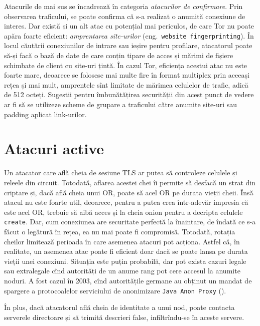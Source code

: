 Atacurile de mai sus se încadrează în categoria \emph{atacurilor de confirmare}.
Prin observarea traficului, se poate confirma că s-a realizat o anumită
conexiune de interes. Dar există și un alt atac cu potențial mai periculos,
de care Tor nu poate apăra foarte eficient: \emph{amprentarea site-urilor}
(eng.\ \texttt{website fingerprinting}). În locul căutării conexiunilor de
intrare sau ieșire pentru profilare, atacatorul poate să-și facă o bază
de date de  care conțin tipare de acces și mărimi de fișiere
schimbate de client cu site-uri țintă. În cazul Tor, eficiența acestui
atac nu este foarte mare, deoarece se folosesc mai multe fire în format
multiplex prin aceeași rețea și mai mult, amprentele sînt limitate de
mărimea celulelor de trafic, adică de 512 octeți. Sugestii pentru îmbunătățirea
securității din acest punct de vedere ar fi să se utilizeze scheme de grupare
a traficului către anumite site-uri sau padding aplicat link-urilor.


\section{Atacuri active}

\indent\indent Un atacator care află cheia de sesiune TLS ar putea
să controleze celulele și releele din circuit. Totodată, aflarea
acestei chei îi permite să desfacă un strat din criptare și, dacă
află cheia unui OR, poate să  acel OR pe durata vieții
cheii. Însă atacul nu este foarte util, deoarece, pentru a putea crea
într-adevăr impresia că este acel OR, trebuie să aibă acces și la cheia
onion pentru a decripta celulele \texttt{create}. Dar, cum conexiunea
are securitate perfectă la înaintare, de îndată ce s-a făcut o legătură
în rețea, ea nu mai poate fi compromisă. Totodată, rotația cheilor
limitează perioada în care asemenea atacuri pot acționa. Astfel că,
în realitate, un asemenea atac poate fi eficient doar dacă se poate
lansa pe durata vieții unei conexiuni. Situația este puțin probabilă,
dar pot exista cazuri legale sau extralegale cînd autorități de un
anume rang pot cere accesul la anumite noduri. A fost cazul în 2003,
cînd autoritățile germane au obținut un mandat de spargere a protocoalelor
serviciului de anonimizare \texttt{Java Anon Proxy} (\cite{jap}).

În plus, dacă atacatorul află cheia de identitate a unui nod, poate
contacta serverele directoare și să trimită descrieri false, infiltrîndu-se
în aceste servere.

